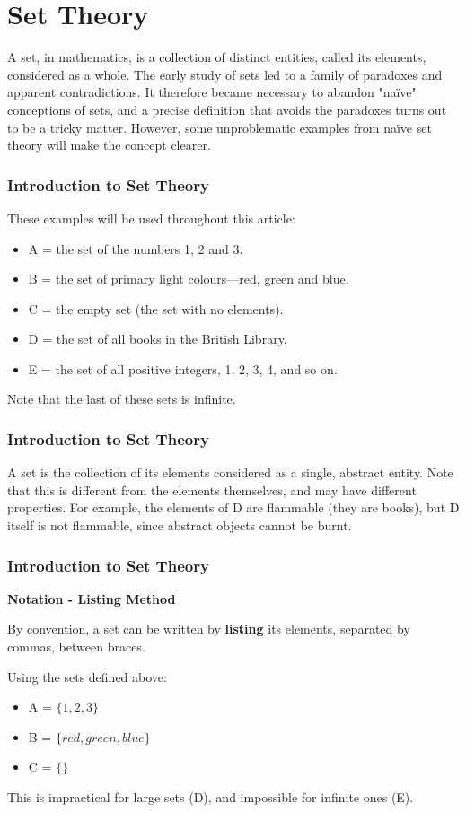 \documentclass[12pt]{article}
\title{}
\author{}
\begin{document}
\section{Set Theory}
\begin{frame}
A set, in mathematics, is a collection of distinct entities, called its elements, considered as a whole. The early study of sets led to a family of paradoxes and apparent contradictions. It therefore became necessary to abandon "naïve" conceptions of sets, and a precise definition that avoids the paradoxes turns out to be a tricky matter. However, some unproblematic examples from naïve set theory will make the concept clearer. 
\end{frame}
\begin{frame}
\frametitle{Introduction to Set Theory}
\large
These examples will be used throughout this article:

\begin{itemize}
\item A = the set of the numbers 1, 2 and 3.
\item B = the set of primary light colours—red, green and blue.
\item C = the empty set (the set with no elements).
\item D = the set of all books in the British Library.
\item E = the set of all positive integers, 1, 2, 3, 4, and so on.
\end{itemize}

Note that the last of these sets is infinite.
\end{frame}
\begin{frame}
	\frametitle{Introduction to Set Theory}
	\large


A set is the collection of its elements considered as a single, abstract entity. Note that this is different from the elements themselves, and may have different properties. For example, the elements of D are flammable (they are books), but D itself is not flammable, since abstract objects cannot be burnt.
\end{frame}
\begin{frame}
	\frametitle{Introduction to Set Theory}
	\large
\textbf{Notation - Listing Method}

By convention, a set can be written by \textbf{listing} its elements, separated by commas, between {braces}. 

Using the sets defined above:
\begin{itemize}
\item A = $\{1, 2, 3\}$
\item B = $\{red, green, blue\}$
\item C = $\{\}$
\end{itemize}
This is impractical for large sets (D), and impossible for infinite ones (E). 
\end{frame}
\end{document}
